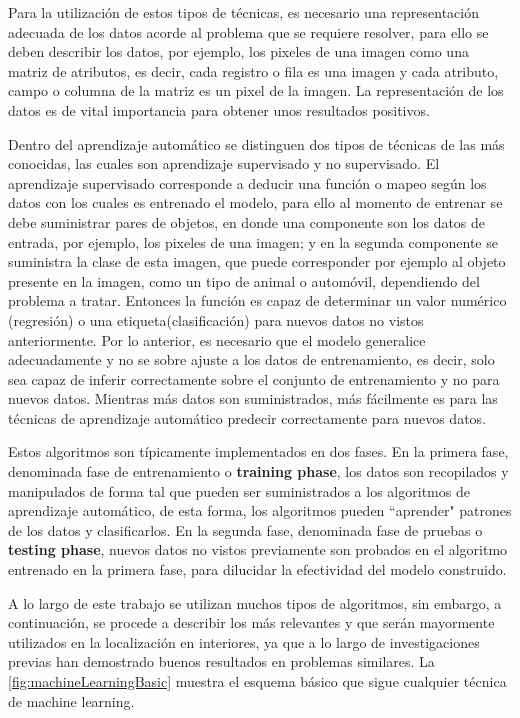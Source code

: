 Para la utilización de estos tipos de técnicas, es necesario una representación adecuada de los datos acorde al problema que se requiere resolver, para ello se deben describir los datos, por ejemplo, los pixeles de una imagen como una matriz de atributos, es decir, cada registro o fila es una imagen y cada atributo, campo o columna de la matriz es un pixel de la imagen. La representación de los datos es de vital importancia para obtener unos resultados positivos.

Dentro del aprendizaje automático se distinguen dos tipos de técnicas de las más conocidas, las cuales son aprendizaje supervisado y no supervisado. El aprendizaje supervisado corresponde a deducir una función o mapeo según los datos con los cuales es entrenado el modelo, para ello al momento de entrenar se debe suministrar pares de objetos, en donde una componente son los datos de entrada, por ejemplo, los pixeles de una imagen; y en la segunda componente se suministra la clase de esta imagen, que puede corresponder por ejemplo al objeto presente en la imagen, como un tipo de animal o automóvil, dependiendo del problema a tratar. Entonces la función es capaz de determinar un valor numérico (regresión) o una etiqueta(clasificación) para nuevos datos no vistos anteriormente. Por lo anterior, es necesario que el modelo generalice adecuadamente y no se sobre ajuste a los datos de entrenamiento, es decir, solo sea capaz de inferir correctamente sobre el conjunto de entrenamiento y no para nuevos datos. Mientras más datos son suministrados, más fácilmente es para las técnicas de aprendizaje automático predecir correctamente para nuevos datos.

Estos algoritmos son típicamente implementados en dos fases. En la primera fase, denominada fase de entrenamiento o \textbf{training phase}, los datos son recopilados y manipulados de forma tal que pueden ser suministrados a los algoritmos de aprendizaje automático, de esta forma, los algoritmos pueden ``aprender" patrones de los datos y clasificarlos. En la segunda fase, denominada fase de pruebas o \textbf{testing phase}, nuevos datos no vistos previamente son probados en el algoritmo entrenado en la primera fase, para dilucidar la efectividad del modelo construido.

A lo largo de este trabajo se utilizan muchos tipos de algoritmos, sin embargo, a continuación, se procede a describir los más relevantes y que serán mayormente utilizados en la localización en interiores, ya que a lo largo de investigaciones previas han demostrado buenos resultados en problemas similares. La \autoref{fig:machineLearningBasic} muestra el esquema básico que sigue cualquier técnica de machine learning.

